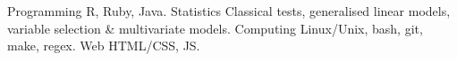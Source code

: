 


\begin{cvskills}

\cvskill
{Programming} %
{R, Ruby, Java.} %
\cvskill
{Statistics} %
{Classical tests, generalised linear models, variable selection \& multivariate models.} %
\cvskill
{Computing} %
{Linux/Unix, bash, git, make, regex.} %
\cvskill
{Web} %
{HTML/CSS, JS.} %

\end{cvskills}
